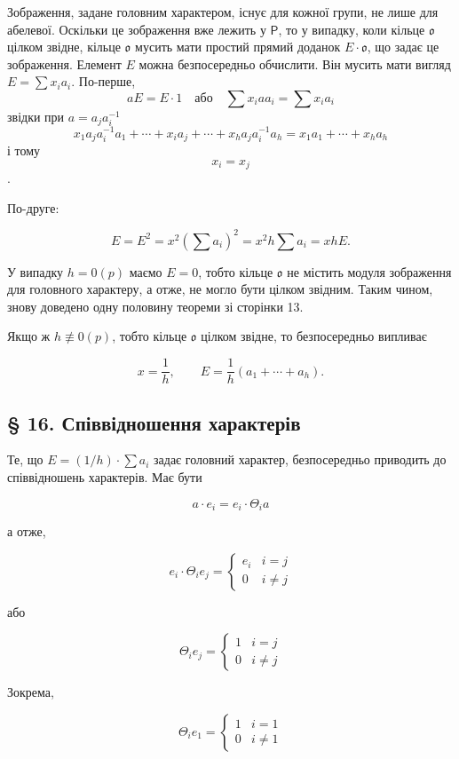\documentclass[11pt]{article}
\begin{document}
Зображення, задане головним характером, існує для кожної групи, не лише для абелевої. Оскільки це зображення вже лежить у \(\mathsf P\), то у випадку, коли кільце \(\mathfrak o\) цілком звідне, кільце \(\mathfrak o\) мусить мати простий прямий доданок \(E\cdot\mathfrak o\), що задає це зображення. Елемент \(E\) можна безпосередньо обчислити. Він мусить мати вигляд \(E=\sum x_i a_i\). По-перше,
\[
aE=E\cdot 1\quad\text{або}\quad \sum x_i a a_i=\sum x_i a_i
\]
звідки при \(a=a_j a_i^{-1}\)
\[
x_1a_ja_i^{-1}a_1+\cdots+x_i a_j+\cdots+x_ha_ja_i^{-1}a_h
=x_1a_1+\cdots+x_ha_h
\]
і тому
\[
x_i=x_j
\]
.

По-друге:

\[
E=E^2=x^2\left(\sum a_i\right)^2=x^2h\sum a_i=xhE.
\]

У випадку \(h=0(p)\) маємо \(E=0\), тобто кільце \(\mathfrak o\) не містить модуля зображення для головного характеру, а отже, не могло бути цілком звідним. Таким чином, знову доведено одну половину теореми зі сторінки 13.

Якщо ж \(h\not\equiv0(p)\), тобто кільце \(\mathfrak o\) цілком звідне, то безпосередньо випливає

\[
x=\frac{1}{h},\qquad E=\frac{1}{h}(a_1+\cdots+a_h).
\]

\subsection*{§ 16. Співвідношення характерів}\label{die-charakterenrelationen}

Те, що \(E=(1/h)\cdot\sum a_i\) задає головний характер, безпосередньо приводить до співвідношень характерів. Має бути

\[a \cdot e_i = e_i \cdot \Theta_i a\]

а отже,

\[e_i \cdot \Theta_i e_j = \begin{cases} e_i & i = j \\ 0 & i \neq j \end{cases}\]

або

\[\Theta_i e_j = \begin{cases} 1 & i = j \\ 0 & i \neq j \end{cases}\]

Зокрема,

\[\Theta_i e_1 = \begin{cases} 1 & i = 1 \\ 0 & i \neq 1 \end{cases}\]
\end{document}

